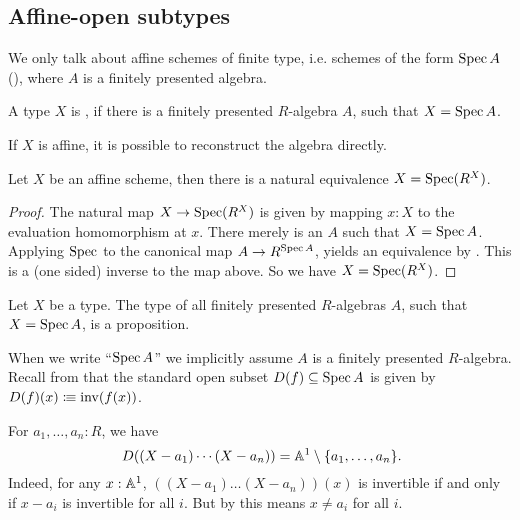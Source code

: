 \subsection{Affine-open subtypes}

We only talk about affine schemes of finite type, i.e. schemes of the form $\operatorname{Spec} A$ (),
where $A$ is a finitely presented algebra.

\begin{definition}%
  A type $X$ is ,
  if there is a finitely presented $R$-algebra $A$, such that $X=\operatorname{Spec} A$.
\end{definition}

If $X$ is affine, it is possible to reconstruct the algebra directly.

\begin{lemma}%
  \label{algebra-from-affine-scheme}
  Let $X$ be an affine scheme, then there is a natural equivalence $X=\operatorname{Spec} (R^X)$.
\end{lemma}

\begin{proof}
  The natural map $X\to \operatorname{Spec} (R^X)$ is given by mapping $x:X$ to the
  evaluation homomorphism at $x$. 
  There merely is an $A$ such that $X=\operatorname{Spec} A$.
  Applying $\operatorname{Spec}$ to the canonical map $A\to R^{\operatorname{Spec} A}$,
  yields an equivalence by .
  This is a (one sided) inverse to the map above.
  So we have $X=\operatorname{Spec} (R^X)$.
\end{proof}

\begin{proposition}%
  Let $X$ be a type.
  The type of all finitely presented $R$-algebras $A$, such that $X=\operatorname{Spec} A$, is a proposition.
\end{proposition}

When we write ``$\operatorname{Spec} A$'' we implicitly assume $A$ is a finitely presented $R$-algebra.
Recall from 
that the standard open subset $D(f) \subseteq \operatorname{Spec} A$
is given by $D(f)(x)\vcentcolon\mspace{-1.2mu}\equiv \mathrm{inv}(f(x))$.

\begin{example}
  For $a_1, \dots, a_n : R$, we have
  \[ D((X - a_1) \cdots (X - a_n)) = \A^1 \setminus \{ a_1, \dots, a_n \} \rlap{.}\]
  Indeed,
  for any $x : \mathbb{A}^1$,
  $((X - a_1) \dots (X - a_n))(x)$ is invertible if and only if
  $x - a_i$ is invertible for all $i$.
  But by 
  this means $x \neq a_i$ for all $i$.
\end{example}

